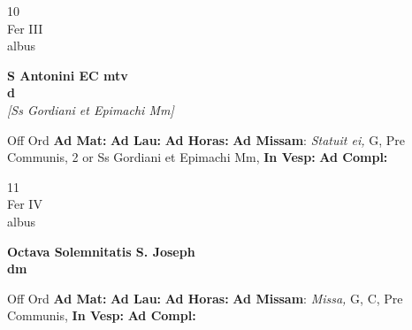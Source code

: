 \documentclass[10pt, openany]{book}
\begin{document}
        \begin{center}
            \begin{minipage}{3.5in}
                \vspace{2em}
                \begin{minipage}{0.5in}
                    {\Huge 10} \\
                    {\normalsize Fer III} \\
                    {\normalsize albus}
                \end{minipage}
                \begin{minipage}{3.0in}
                    \textbf{ \large S Antonini EC mtv \\
                    \textnormal{\normalsize d}} \\ \textit{[Ss Gordiani et Epimachi Mm]} \\ 
                \end{minipage}
                \begin{justify}Off Ord
                    \textbf{Ad Mat: }
                    \textbf{Ad Lau: }
                    \textbf{Ad Horas: }\textbf{Ad Missam}: \textit{Statuit ei,} G, Pre Communis, 2 or Ss Gordiani et Epimachi Mm,  
                    \textbf{In Vesp: }
                    \textbf{Ad Compl: }
                \end{justify}
            \end{minipage}
        \end{center}
    
        \begin{center}
            \begin{minipage}{3.5in}
                \vspace{2em}
                \begin{minipage}{0.5in}
                    {\Huge 11} \\
                    {\normalsize Fer IV} \\
                    {\normalsize albus}
                \end{minipage}
                \begin{minipage}{3.0in}
                    \textbf{ \large Octava Solemnitatis S. Joseph \\
                    \textnormal{\normalsize dm}} \\ 
                \end{minipage}
                \begin{justify}Off Ord
                    \textbf{Ad Mat: }
                    \textbf{Ad Lau: }
                    \textbf{Ad Horas: }\textbf{Ad Missam}: \textit{Missa,} G, C, Pre Communis,  
                    \textbf{In Vesp: }
                    \textbf{Ad Compl: }
                \end{justify}
            \end{minipage}
        \end{center}
    
\end{document}
